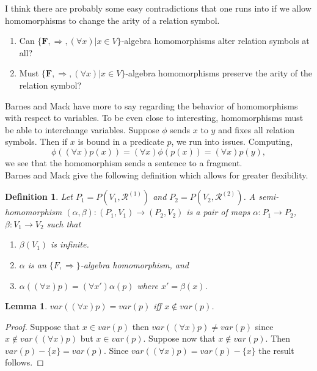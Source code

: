 \documentclass{article}
\theoremstyle{problemstyle}
\theoremstyle{lemmastyle}
\newtheorem{lemma}{Lemma}
\theoremstyle{theoremstyle}
\theoremstyle{problemstyle}
\newtheorem{definition}{Definition}
\theoremstyle{problemstyle}
\begin{document}
I think there are probably some easy contradictions that one runs into if we allow homomorphisms to change the arity of a relation symbol.  

\begin{enumerate}
\item Can $\{\textbf{F}, \Rightarrow, (\forall x) | x \in V\}$-algebra homomorphisms alter relation symbols at all?
\item Must $\{\textbf{F}, \Rightarrow, (\forall x) | x \in V\}$-algebra homomorphisms preserve the arity of the relation symbol?
\end{enumerate}

Barnes and Mack have more to say regarding the behavior of homomorphisms with respect to variables. To be even close to interesting, homomorphisms must be able to interchange variables. Suppose $\phi$ sends $x$ to $y$ and fixes all relation symbols. Then if $x$ is bound in a predicate $p$, we run into issues. Computing, $$\phi((\forall x)p(x)) = (\forall x)\phi(p(x)) = (\forall x)p(y),$$ we see that the homomorphism sends a sentence to a fragment.\\

Barnes and Mack give the following definition which allows for greater flexibility. 

\begin{definition}
Let $P_1 = P(V_1,\mathscr{R}^{(1)})$ and $P_2 = P(V_2,\mathscr{R}^{(2)})$. A \textit{semi-homomorphism} $(\alpha,\beta):(P_1,V_1) \rightarrow (P_2,V_2)$ is a pair of maps $\alpha:P_1 \rightarrow P_2$, $\beta:V_1 \rightarrow V_2$ such that 
\begin{enumerate}
\item $\beta(V_1)$ is infinite. 
\item $\alpha$ is an $\{F, \Rightarrow\}$-algebra homomorphism, and 
\item $\alpha((\forall x)p) = (\forall x')\alpha(p)$ where $x' = \beta(x)$.  
\end{enumerate}
\end{definition}

\begin{lemma}
$var((\forall x)p) = var(p)$ iff $x \notin var(p)$. 
\end{lemma}

\begin{proof}
Suppose that $x \in var(p)$ then $var((\forall x)p) \neq var(p)$ since $x \notin var((\forall x)p)$ but $x \in var(p)$. Suppose now that $x \notin var(p)$. Then $var(p)-\{x\} = var(p)$. Since $var((\forall x)p) = var(p) - \{x\}$ the result follows. 
\end{proof}
\end{document}
